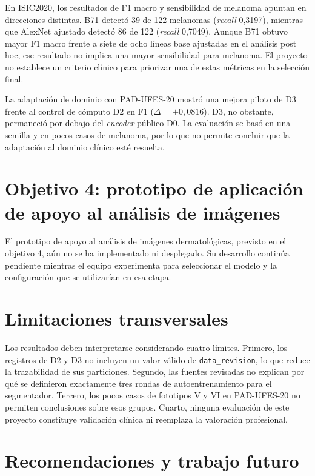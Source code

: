 En ISIC2020, los resultados de F1 macro y sensibilidad de melanoma apuntan en direcciones distintas. B71 detectó 39 de 122 melanomas (\textit{recall} 0,3197), mientras que AlexNet ajustado detectó 86 de 122 (\textit{recall} 0,7049). Aunque B71 obtuvo mayor F1 macro frente a siete de ocho líneas base ajustadas en el análisis post hoc, ese resultado no implica una mayor sensibilidad para melanoma. El proyecto no establece un criterio clínico para priorizar una de estas métricas en la selección final.

La adaptación de dominio con PAD-UFES-20 mostró una mejora piloto de D3 frente al control de cómputo D2 en F1 ($\Delta=+0{,}0816$). D3, no obstante, permaneció por debajo del \textit{encoder} público D0. La evaluación se basó en una semilla y en pocos casos de melanoma, por lo que no permite concluir que la adaptación al dominio clínico esté resuelta.

\section*{Objetivo 4: prototipo de aplicación de apoyo al análisis de imágenes}

El prototipo de apoyo al análisis de imágenes dermatológicas, previsto en el objetivo 4, aún no se ha implementado ni desplegado. Su desarrollo continúa pendiente mientras el equipo experimenta para seleccionar el modelo y la configuración que se utilizarían en esa etapa.

\section*{Limitaciones transversales}

Los resultados deben interpretarse considerando cuatro límites. Primero, los registros de D2 y D3 no incluyen un valor válido de \texttt{data\_revision}, lo que reduce la trazabilidad de sus particiones. Segundo, las fuentes revisadas no explican por qué se definieron exactamente tres rondas de autoentrenamiento para el segmentador. Tercero, los pocos casos de fototipos V y VI en PAD-UFES-20 no permiten conclusiones sobre esos grupos. Cuarto, ninguna evaluación de este proyecto constituye validación clínica ni reemplaza la valoración profesional.

\section{Recomendaciones y trabajo futuro}

